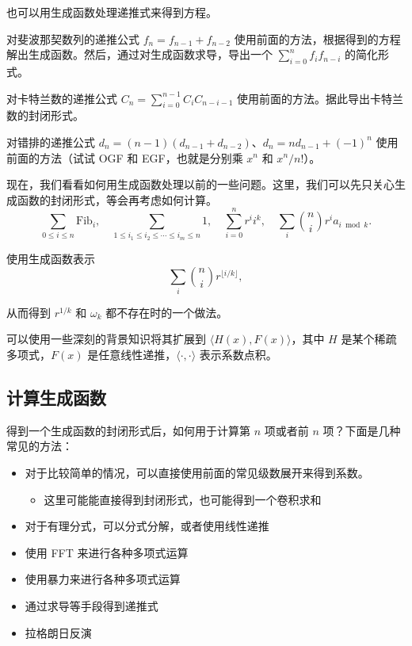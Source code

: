     也可以用生成函数处理递推式来得到方程。

    \begin{example}
        对斐波那契数列的递推公式 $f_n=f_{n-1}+f_{n-2}$ 使用前面的方法，根据得到的方程解出生成函数。然后，通过对生成函数求导，导出一个 $\sum_{i=0}^nf_if_{n-i}$ 的简化形式。
    \end{example}
    
    \begin{exercise}
        对卡特兰数的递推公式 $C_n=\sum_{i=0}^{n-1}C_iC_{n-i-1}$ 使用前面的方法。据此导出卡特兰数的封闭形式。
    \end{exercise}

    \begin{exercise}
    对错排的递推公式 $d_n=(n-1)(d_{n-1}+d_{n-2})$、$d_n=nd_{n-1}+(-1)^n$ 使用前面的方法（试试 OGF 和 EGF，也就是分别乘 $x^n$ 和 $x^n/n!$）。
    \end{exercise}

    现在，我们看看如何用生成函数处理以前的一些问题。这里，我们可以先只关心生成函数的封闭形式，等会再考虑如何计算。
    $$
    \sum_{0\le i\le n}\mathrm{Fib}_i,\quad \sum_{1\le i_1\le i_2\le\cdots\le i_m\le n} 1,\quad     \sum_{i=0}^n r^ii^k,\quad \sum_i\binom{n}{i}r^ia_{i\bmod k}.
    $$

    \begin{exercise}
        使用生成函数表示
        $$
    \sum_i\binom{n}{i}r^{\lfloor i/k\rfloor},
    $$

    从而得到 $r^{1/k}$ 和 $\omega_k$ 都不存在时的一个做法。
    \end{exercise}
    \begin{remark}
        可以使用一些深刻的背景知识将其扩展到 $\langle H(x),F(x)\rangle$，其中 $H$ 是某个稀疏多项式，$F(x)$ 是任意线性递推，$\langle \cdot,\cdot\rangle$ 表示系数点积。
    \end{remark}

\subsection{计算生成函数}
    得到一个生成函数的封闭形式后，如何用于计算第 $n$ 项或者前 $n$ 项？下面是几种常见的方法：
    \begin{itemize}
        \item 对于比较简单的情况，可以直接使用前面的常见级数展开来得到系数。
            \begin{itemize}
                \item 这里可能能直接得到封闭形式，也可能得到一个卷积求和
            \end{itemize}
        \item 对于有理分式，可以分式分解，或者使用线性递推
        \item 使用 FFT 来进行各种多项式运算
        \item 使用暴力来进行各种多项式运算
        \item 通过求导等手段得到递推式
        \item 拉格朗日反演
    \end{itemize}


